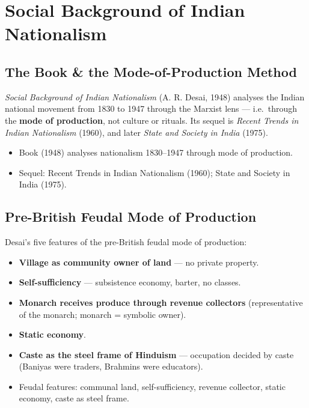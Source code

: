 \chapter{Social Background of Indian Nationalism}

\section{The Book \& the Mode-of-Production Method}

\emph{Social Background of Indian Nationalism} (A. R. Desai, 1948) analyses the Indian national movement from 1830 to 1947 through the Marxist lens --- i.e.\ through the \textbf{mode of production}, not culture or rituals. Its sequel is \emph{Recent Trends in Indian Nationalism} (1960), and later \emph{State and Society in India} (1975).

\begin{QuickRevision}
\begin{itemize}
\item Book (1948) analyses nationalism 1830--1947 through mode of production.
\item Sequel: Recent Trends in Indian Nationalism (1960); State and Society in India (1975).
\end{itemize}
\end{QuickRevision}

\section{Pre-British Feudal Mode of Production}

Desai's five features of the pre-British feudal mode of production:
\begin{itemize}
\item \textbf{Village as community owner of land} --- no private property.
\item \textbf{Self-sufficiency} --- subsistence economy, barter, no classes.
\item \textbf{Monarch receives produce through revenue collectors} (representative of the monarch; monarch = symbolic owner).
\item \textbf{Static economy}.
\item \textbf{Caste as the steel frame of Hinduism} --- occupation decided by caste (Baniyas were traders, Brahmins were educators).
\end{itemize}

\begin{QuickRevision}
\begin{itemize}
\item Feudal features: communal land, self-sufficiency, revenue collector, static economy, caste as steel frame.
\end{itemize}
\end{QuickRevision}

